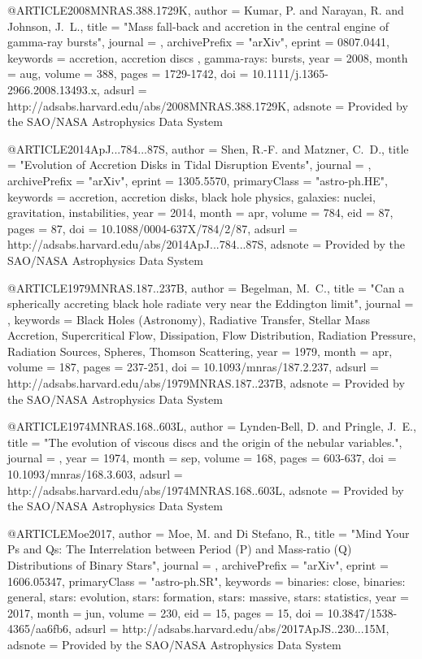 \documentclass[twocolumn,tighten]{aastex63}
\begin{document}
{{{{{@ARTICLE{2008MNRAS.388.1729K,
   author = {{Kumar}, P. and {Narayan}, R. and {Johnson}, J.~L.},
    title = "{Mass fall-back and accretion in the central engine of gamma-ray bursts}",
  journal = {\mnras},
archivePrefix = "arXiv",
   eprint = {0807.0441},
 keywords = {accretion, accretion discs , gamma-rays: bursts},
     year = 2008,
    month = aug,
   volume = 388,
    pages = {1729-1742},
      doi = {10.1111/j.1365-2966.2008.13493.x},
   adsurl = {http://adsabs.harvard.edu/abs/2008MNRAS.388.1729K},
  adsnote = {Provided by the SAO/NASA Astrophysics Data System}
}

@ARTICLE{2014ApJ...784...87S,
   author = {{Shen}, R.-F. and {Matzner}, C.~D.},
    title = "{Evolution of Accretion Disks in Tidal Disruption Events}",
  journal = {\apj},
archivePrefix = "arXiv",
   eprint = {1305.5570},
 primaryClass = "astro-ph.HE",
 keywords = {accretion, accretion disks, black hole physics, galaxies: nuclei, gravitation, instabilities},
     year = 2014,
    month = apr,
   volume = 784,
      eid = {87},
    pages = {87},
      doi = {10.1088/0004-637X/784/2/87},
   adsurl = {http://adsabs.harvard.edu/abs/2014ApJ...784...87S},
  adsnote = {Provided by the SAO/NASA Astrophysics Data System}
}

@ARTICLE{1979MNRAS.187..237B,
   author = {{Begelman}, M.~C.},
    title = "{Can a spherically accreting black hole radiate very near the Eddington limit}",
  journal = {\mnras},
 keywords = {Black Holes (Astronomy), Radiative Transfer, Stellar Mass Accretion, Supercritical Flow, Dissipation, Flow Distribution, Radiation Pressure, Radiation Sources, Spheres, Thomson Scattering},
     year = 1979,
    month = apr,
   volume = 187,
    pages = {237-251},
      doi = {10.1093/mnras/187.2.237},
   adsurl = {http://adsabs.harvard.edu/abs/1979MNRAS.187..237B},
  adsnote = {Provided by the SAO/NASA Astrophysics Data System}
}

@ARTICLE{1974MNRAS.168..603L,
   author = {{Lynden-Bell}, D. and {Pringle}, J.~E.},
    title = "{The evolution of viscous discs and the origin of the nebular variables.}",
  journal = {\mnras},
     year = 1974,
    month = sep,
   volume = 168,
    pages = {603-637},
      doi = {10.1093/mnras/168.3.603},
   adsurl = {http://adsabs.harvard.edu/abs/1974MNRAS.168..603L},
  adsnote = {Provided by the SAO/NASA Astrophysics Data System}
}

@ARTICLE{Moe2017,
   author = {{Moe}, M. and {Di Stefano}, R.},
    title = "{Mind Your Ps and Qs: The Interrelation between Period (P) and Mass-ratio (Q) Distributions of Binary Stars}",
  journal = {\apjs},
archivePrefix = "arXiv",
   eprint = {1606.05347},
 primaryClass = "astro-ph.SR",
 keywords = {binaries: close, binaries: general, stars: evolution, stars: formation, stars: massive, stars: statistics},
     year = 2017,
    month = jun,
   volume = 230,
      eid = {15},
    pages = {15},
      doi = {10.3847/1538-4365/aa6fb6},
   adsurl = {http://adsabs.harvard.edu/abs/2017ApJS..230...15M},
  adsnote = {Provided by the SAO/NASA Astrophysics Data System}
}

}}}}}
\end{document}
